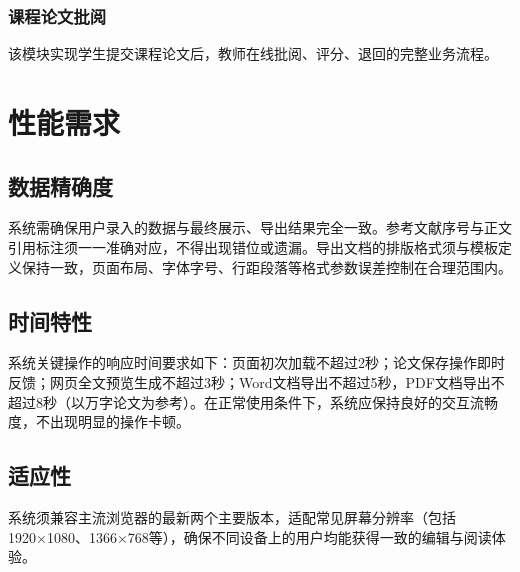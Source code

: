 \documentclass{softeng}
\begin{document}
    \subsubsection{课程论文批阅}
	该模块实现学生提交课程论文后，教师在线批阅、评分、退回的完整业务流程。



	
\section{性能需求}
\subsection{数据精确度}
系统需确保用户录入的数据与最终展示、导出结果完全一致。参考文献序号与正文引用标注须一一准确对应，不得出现错位或遗漏。导出文档的排版格式须与模板定义保持一致，页面布局、字体字号、行距段落等格式参数误差控制在合理范围内。

\subsection{时间特性}
系统关键操作的响应时间要求如下：页面初次加载不超过2秒；论文保存操作即时反馈；网页全文预览生成不超过3秒；Word文档导出不超过5秒，PDF文档导出不超过8秒（以万字论文为参考）。在正常使用条件下，系统应保持良好的交互流畅度，不出现明显的操作卡顿。

\subsection{适应性}
系统须兼容主流浏览器的最新两个主要版本，适配常见屏幕分辨率（包括1920×1080、1366×768等），确保不同设备上的用户均能获得一致的编辑与阅读体验。
\end{document}
